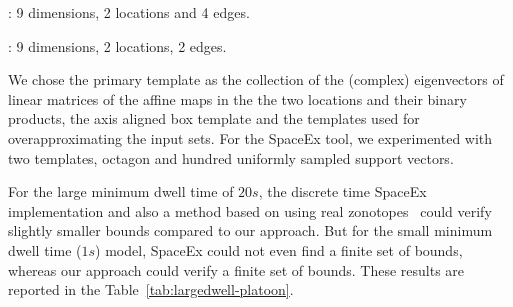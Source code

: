 : 9 dimensions, 2
locations and 4 edges.

: 9 dimensions, 2
locations, 2 edges.

  We chose the primary template
as the collection of the (complex) eigenvectors of linear matrices of
the affine maps in the the two locations and their binary products,
the axis aligned box template and the templates used for
overapproximating the input sets. For the SpaceEx tool, we
experimented with two templates, octagon and hundred uniformly sampled
support vectors.

  For the large minimum dwell time of $20s$, the
discrete time SpaceEx implementation and also a method based on using
real zonotopes~\cite{makhlouf2014networked} could verify slightly
smaller bounds compared to our approach.
But for the small minimum dwell time ($1s$) model, SpaceEx could not
even find a finite set of bounds, whereas our approach could verify a
finite set of bounds.  These results are reported in the
Table~\ref{tab:largedwell-platoon}.





